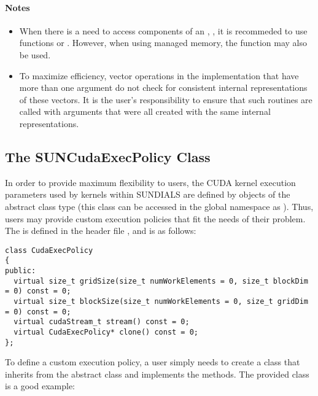 \paragraph{\bf Notes}

\begin{itemize}

\item
  When there is a need to access components of an , ,
  it is recommeded to use functions  or
  . However, when using managed memory, the
  function  may also be used.

\item
  {\warn}To maximize efficiency, vector operations in the {\nveccuda} implementation
  that have more than one  argument do not check for
  consistent internal representations of these vectors. It is the user's
  responsibility to ensure that such routines are called with 
  arguments that were all created with the same internal representations.

\end{itemize}

\subsection{The SUNCudaExecPolicy Class}\label{ss:suncudaexecpolicy}

In order to provide maximum flexibility to users, the CUDA kernel execution parameters used
by kernels within SUNDIALS are defined by objects of the 
abstract class type (this class can be accessed in the global namespace as ).
Thus, users may provide custom execution policies that fit the needs of their problem. The
 is defined in the header file ,
and is as follows:

\begin{verbatim}
class CudaExecPolicy
{
public:
  virtual size_t gridSize(size_t numWorkElements = 0, size_t blockDim = 0) const = 0;
  virtual size_t blockSize(size_t numWorkElements = 0, size_t gridDim = 0) const = 0; 
  virtual cudaStream_t stream() const = 0;
  virtual CudaExecPolicy* clone() const = 0;
};
\end{verbatim}

To define a custom execution policy, a user simply needs to create a class that inherits from
the abstract class and implements the methods. The {\sundials} provided 
class is a good example:

